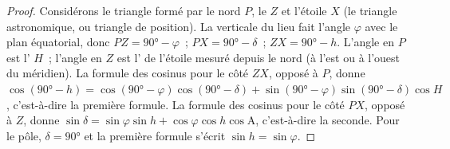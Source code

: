 \begin{proof}
Considérons le triangle formé par le  nord $P$, le  $Z$
et l'étoile $X$ (le triangle astronomique, ou triangle de position). La
verticale du lieu fait l'angle $\varphi$ avec le plan équatorial, donc $PZ =
\ang{90} - \varphi$~; $PX = \ang{90} - \delta$~; $ZX = \ang{90} - h$. L'angle
en $P$ est l' $H$~; l'angle en $Z$ est l' de l'étoile
mesuré depuis le nord (à l'est ou à l'ouest du méridien). La formule des
cosinus pour le côté $ZX$, opposé à $P$, donne
$\cos(\ang{90} - h) = \cos(\ang{90} - \varphi)\cos(\ang{90} - \delta) +
\sin(\ang{90} - \varphi)\sin(\ang{90} - \delta)\cos H$, c'est-à-dire la première
formule. La formule des cosinus pour le côté $PX$, opposé à $Z$, donne
$\sin\delta = \sin\varphi\sin h + \cos\varphi\cos h\cos\mathrm{A}$, c'est-à-dire
la seconde. Pour le pôle, $\delta = \ang{90}$ et la première formule s'écrit
$\sin h = \sin\varphi$.
\end{proof}

